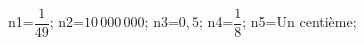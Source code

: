 \documentclass[exercice]{thedocument}%
\begin{document}
%
    \>n1=$\dfrac{1}{49}$;%
    \>n2=$10\,000\,000$;%
    \>n3=$0,5$;%
    \>n4=$\dfrac{1}{8}$;%
    \>n5=Un centième;%
\end{document}
